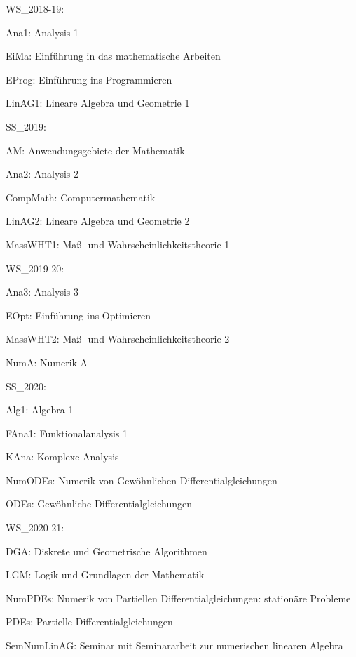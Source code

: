 
WS_2018-19:

Ana1:
Analysis 1

EiMa:
Einführung in das mathematische Arbeiten

EProg:
Einführung ins Programmieren

LinAG1:
Lineare Algebra und Geometrie 1


SS_2019:

AM:
Anwendungsgebiete der Mathematik

Ana2:
Analysis 2

CompMath:
Computermathematik

LinAG2:
Lineare Algebra und Geometrie 2

MassWHT1:
Maß- und Wahrscheinlichkeitstheorie 1


WS_2019-20:

Ana3:
Analysis 3

EOpt:
Einführung ins Optimieren

MassWHT2:
Maß- und Wahrscheinlichkeitstheorie 2

NumA:
Numerik A


SS_2020:

Alg1:
Algebra 1

FAna1:
Funktionalanalysis 1

KAna:
Komplexe Analysis

NumODEs:
Numerik von Gewöhnlichen Differentialgleichungen

ODEs:
Gewöhnliche Differentialgleichungen


WS_2020-21:

DGA:
Diskrete und Geometrische Algorithmen

LGM:
Logik und Grundlagen der Mathematik

NumPDEs:
Numerik von Partiellen Differentialgleichungen: stationäre Probleme

PDEs:
Partielle Differentialgleichungen

SemNumLinAG:
Seminar mit Seminararbeit zur numerischen linearen Algebra

